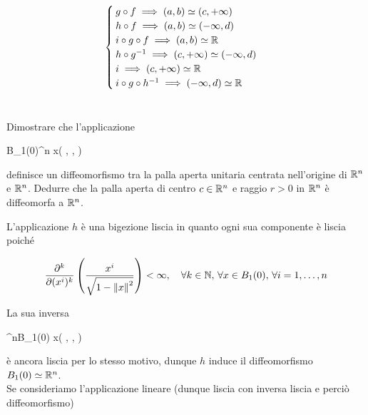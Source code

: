 \begin{equation}
	\begin{cases}
		g \circ f \implies (a,b) \simeq (c,+\infty)\\
		h \circ f \implies (a,b) \simeq (-\infty,d)\\
		i \circ g \circ f \implies (a,b) \simeq \mathbb{R}\\
		h \circ g^{-1} \implies (c,+\infty) \simeq (-\infty,d)\\
		i \implies (c,+\infty) \simeq \mathbb{R}\\
		i \circ g \circ h^{-1} \implies (-\infty,d) \simeq \mathbb{R}
	\end{cases}
\end{equation}

%

\newpage

%

\section{}\label{es1-4}

\begin{tcolorbox}
	Dimostrare che l'applicazione
	
		{B_{1}(0)}{\R^{n}}
		{x}{\left( , \cdots,  \right)}
	
	definisce un diffeomorfismo tra la palla aperta unitaria centrata nell'origine di $ \mathbb{R}^{n} $ e $ \mathbb{R}^{n} $. Dedurre che la palla aperta di centro $ c \in \mathbb{R}^{n} $ e raggio $ r > 0 $ in $ \mathbb{R}^{n} $ è diffeomorfa a $ \mathbb{R}^{n} $.
\end{tcolorbox}

L'applicazione $ h $ è una bigezione liscia in quanto ogni sua componente è liscia poiché

\begin{equation}
	\pdv[k]{(x^{i})} \left( \dfrac{x^{i}}{\sqrt{ 1-\norm{x}^{2} }} \right) < \infty \qcomma \forall k \in \N, \, \forall x \in B_{1}(0), \, \forall i=1,\dots,n
\end{equation}

La sua inversa

	{\R^{n}}{B_{1}(0)}
	{x}{\left( , \cdots,  \right)}
	
è ancora liscia per lo stesso motivo, dunque $ h $ induce il diffeomorfismo $ B_{1}(0) \simeq \mathbb{R}^{n} $.\\
Se consideriamo l'applicazione lineare (dunque liscia con inversa liscia e perciò diffeomorfismo)

